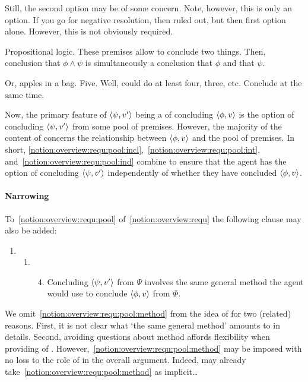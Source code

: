 \begin{note}
  Still, the second option may be of some concern.
  Note, however, this is only an option.
  If you go for negative resolution, then ruled out, but then first option alone.
  However, this is not obviously required.

  Propositional logic.
  These premises allow to conclude two things.
  Then, conclusion that \(\phi \land \psi\) is simultaneously a conclusion that \(\phi\) and that \(\psi\).

  Or, apples in a bag.
  Five.
  Well, could do at least four, three, etc.
  Conclude at the same time.
\end{note}

\begin{note}[\requ{1}]
  Now, the primary feature of \(\langle \psi, v' \rangle\) being a \requ{} of concluding \(\langle \phi, v \rangle\) is the option of concluding \(\langle \psi, v' \rangle\) from some pool of premises.
  However, the majority of the content of \label{idea:Zs:overview:requ} concerns the relationship between \(\langle \phi, v \rangle\) and the pool of premises.
  In short, \autoref{notion:overview:requ:pool:incl},~\autoref{notion:overview:requ:pool:int}, and~\autoref{notion:overview:requ:pool:ind} combine to ensure that the agent has the option of concluding \(\langle \psi, v' \rangle\) independently of whether they have concluded \(\langle \phi, v \rangle\).
\end{note}

\paragraph*{Narrowing }

\begin{note}
  To~\autoref{notion:overview:requ:pool} of~\autoref{notion:overview:requ} the following clause may also be added:
  \begin{enumerate}[label=]
  \item
    \begin{enumerate}[label=]
    \item
      \begin{enumerate}[label=\roman*., ref=(\roman*), resume*=csIdeaCounter]
        \setcounter{enumiii}{3}
      \item
        \label{notion:overview:requ:pool:method}
        Concluding \(\langle \psi, v' \rangle\) from \(\Psi\) involves the same general method the agent would use to conclude \(\langle \phi, v \rangle\) from \(\Phi\).
      \end{enumerate}
    \end{enumerate}
  \end{enumerate}
  We omit~\autoref{notion:overview:requ:pool:method} from the idea of \csN{} for two (related) reasons.
  First, it is not clear what `the same general method' amounts to in details.
  Second, avoiding questions about method affords flexibility when providing  of \csN{}.
  However,~\autoref{notion:overview:requ:pool:method} may be imposed with no loss to the role of \csN{} in the overall argument.
  Indeed, may already take~\autoref{notion:overview:requ:pool:method} as implicit\dots
\end{note}

